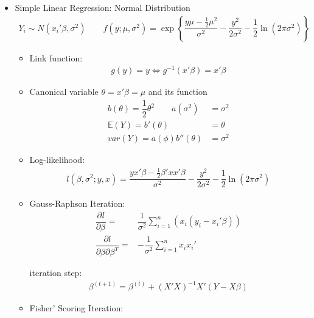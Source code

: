 \begin{itemize}[topsep=2pt,itemsep=0pt]
    \item Simple Linear Regression: Normal Distribution
    \begin{align}
        Y_i\sim N(x_i'\beta ,\sigma^2)\qquad f(y;\mu ,\sigma ^2 )=\exp\left\{ \dfrac{y\mu-\frac{1}{2}\mu ^2}{\sigma ^2}-\dfrac{y^2}{2\sigma ^2}-\dfrac{1}{2}\ln(2\pi\sigma ^2) \right\}
    \end{align}  
    \begin{itemize}[topsep=2pt,itemsep=0pt]
        \item Link function:
    \begin{align}
        g(y)=y \Leftrightarrow g^{-1}(x'\beta )= x'\beta 
    \end{align}

        \item Canonical variable $ \theta =x'\beta =\mu  $ and its function
    \begin{align}
        b(\theta )=\dfrac{1}{2}\theta  ^2\qquad  a(\sigma ^2)&=\sigma ^2\\
        \mathbb{E}(Y)=b'(\theta  )&=\theta  \\
        var(Y)=a(\phi )b''(\theta  )&=\sigma ^2
    \end{align}
        
    \item Log-likelihood:
    \begin{align}
        l(\beta ,\sigma ^2;y,x)= \dfrac{yx'\beta -\frac{1}{2}\beta 'xx'\beta  }{\sigma ^2}-\dfrac{y^2}{2\sigma ^2}-\dfrac{1}{2}\ln(2\pi\sigma ^2) 
    \end{align}
    
    
        \item Gauss-Raphson Iteration:
        \begin{align}
            \dfrac{\partial^{} l}{\partial \beta ^{}}=&\dfrac{1}{\sigma ^2}\sum_{i=1}^n\left( x_i(y_i-x_i'\beta ) \right)\\
            \dfrac{\partial l}{\partial \beta \partial\beta ^T}=&-\dfrac{1}{\sigma ^2}\sum_{i=1}^n x_ix_i'
        \end{align}
        
        iteration step:
        \begin{align}
            \beta ^{(t+1)}= \beta ^{(t)}+(X'X)^{-1}X'(Y-X\beta )
        \end{align}
        
        \item Fisher' Scoring Iteration:
        

\end{itemize}
\end{itemize}
